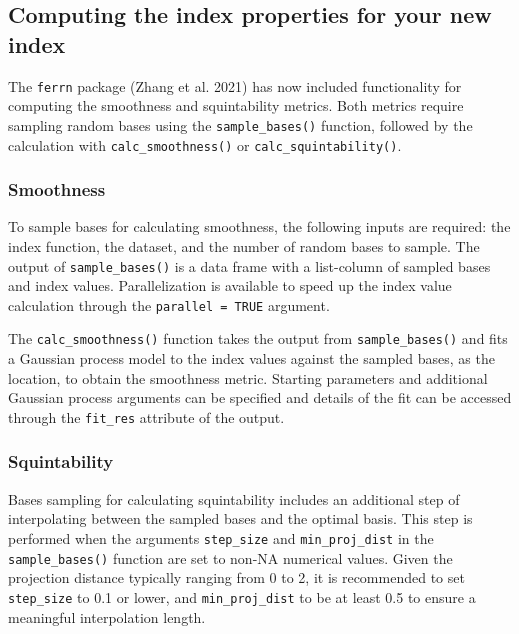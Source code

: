 \documentclass[
  12pt,
]{interact}
\theoremstyle{plain}
\begin{document}
\subsection{Computing the index properties for your new
index}\label{computing-the-index-properties-for-your-new-index}

The \texttt{ferrn} package (Zhang et al. 2021) has now included
functionality for computing the smoothness and squintability metrics.
Both metrics require sampling random bases using the
\texttt{sample\_bases()} function, followed by the calculation with
\texttt{calc\_smoothness()} or \texttt{calc\_squintability()}.

\subsubsection{Smoothness}\label{smoothness}

To sample bases for calculating smoothness, the following inputs are
required: the index function, the dataset, and the number of random
bases to sample. The output of \texttt{sample\_bases()} is a data frame
with a list-column of sampled bases and index values. Parallelization is
available to speed up the index value calculation through the
\texttt{parallel\ =\ TRUE} argument.

The \texttt{calc\_smoothness()} function takes the output from
\texttt{sample\_bases()} and fits a Gaussian process model to the index
values against the sampled bases, as the location, to obtain the
smoothness metric. Starting parameters and additional Gaussian process
arguments can be specified and details of the fit can be accessed
through the \texttt{fit\_res} attribute of the output.

\subsubsection{Squintability}\label{squintability}

Bases sampling for calculating squintability includes an additional step
of interpolating between the sampled bases and the optimal basis. This
step is performed when the arguments \texttt{step\_size} and
\texttt{min\_proj\_dist} in the \texttt{sample\_bases()} function are
set to non-NA numerical values. Given the projection distance typically
ranging from 0 to 2, it is recommended to set \texttt{step\_size} to 0.1
or lower, and \texttt{min\_proj\_dist} to be at least 0.5 to ensure a
meaningful interpolation length.
\end{document}
